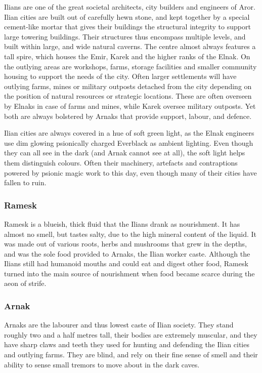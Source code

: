 Ilians are one of the great societal architects, city builders and engineers
of Aror. Ilian cities are built out of carefully hewn stone, and kept together
by a special cement-like mortar that gives their buildings the structural
integrity to support large towering buildings. Their structures thus encompass
multiple levels, and built within large, and wide natural caverns. The centre
almost always features a tall spire, which houses the Emir, Karek and the
higher ranks of the Elnak. On the outlying areas are workshops, farms, storage
facilities and smaller community housing to support the needs of the
city. Often larger settlements will have outlying farms, mines or military
outposts detached from the city depending on the position of natural resources
or strategic locations. These are often overseen by Elnaks in case of farms
and mines, while Karek oversee military outposts. Yet both are always
bolstered by Arnaks that provide support, labour, and defence.

Ilian cities are always covered in a hue of soft green light, as the Elnak
engineers use dim glowing psionically charged Everblack as ambient
lighting. Even though they can all see in the dark (and Arnak cannot see at
all), the soft light helps them distinguish colours. Often their machinery,
artefacts and contraptions powered by psionic magic work to this day, even
though many of their cities have fallen to ruin.

\subsubsection{Ramesk}
\label{sec:Ramesk}

Ramesk is a blueish, thick fluid that the Ilians drank as nourishment. It has
almost no smell, but tastes salty, due to the high mineral content of the
liquid. It was made out of various roots, herbs and mushrooms that grew in the
depths, and was the sole food provided to Arnaks, the Ilian worker caste.
Although the Ilians still had humanoid mouths and could eat and digest other
food, Ramesk turned into the main source of nourishment when food became scarce
during the aeon of strife.

\subsubsection{Arnak}
\label{sec:Arnak}

Arnaks are the labourer and thus lowest caste of Ilian society. They stand
roughly two and a half metres tall, their bodies are extremely muscular, and
they have sharp claws and teeth they used for hunting and defending the Ilian
cities and outlying farms. They are blind, and rely on their fine sense of
smell and their ability to sense small tremors to move about in the dark caves.

